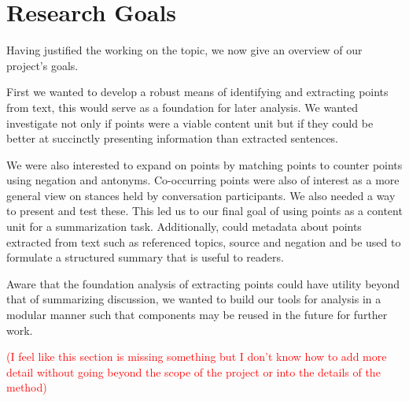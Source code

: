 \chapter{Research Goals\label{chap:res-goals}}
  Having justified the working on the topic, we now give an overview of our project's goals.

  First we wanted to develop a robust means of identifying and extracting points from text, this would serve as a foundation for later analysis. We wanted investigate not only if points were a viable content unit but if they could be better at succinctly presenting information than extracted sentences.

  We were also interested to expand on points by matching points to counter points using negation and antonyms. Co-occurring points were also of interest as a more general view on stances held by conversation participants. We also needed a way to present and test these. This led us to our final goal of using points as a content unit for a summarization task. Additionally, could metadata about points extracted from text such as referenced topics, source and negation and be used to formulate a structured summary that is useful to readers.

  Aware that the foundation analysis of extracting points could have utility beyond that of summarizing discussion, we wanted to build our tools for analysis in a modular manner such that components may be reused in the future for further work.

  \textcolor{red}{(I feel like this section is missing something but I don't know how to add more detail without going beyond the scope of the project or into the details of the method)}
